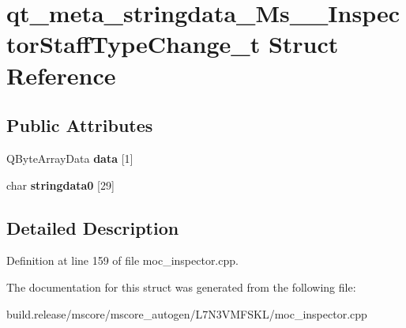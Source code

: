 \hypertarget{structqt__meta__stringdata___ms_____inspector_staff_type_change__t}{}\section{qt\+\_\+meta\+\_\+stringdata\+\_\+\+Ms\+\_\+\+\_\+\+Inspector\+Staff\+Type\+Change\+\_\+t Struct Reference}
\label{structqt__meta__stringdata___ms_____inspector_staff_type_change__t}
\subsection*{Public Attributes}
\begin{DoxyCompactItemize}
\item 
\mbox{\label{structqt__meta__stringdata___ms_____inspector_staff_type_change__t_a28ab1f6df434dcad7b65ca5a0aef530a}} 
Q\+Byte\+Array\+Data {\bfseries data} \mbox{[}1\mbox{]}
\item 
\mbox{\label{structqt__meta__stringdata___ms_____inspector_staff_type_change__t_a2ed5536fad0521e83771d45ee45fa00a}} 
char {\bfseries stringdata0} \mbox{[}29\mbox{]}
\end{DoxyCompactItemize}


\subsection{Detailed Description}


Definition at line 159 of file moc\+\_\+inspector.\+cpp.



The documentation for this struct was generated from the following file\+:\begin{DoxyCompactItemize}
\item 
build.\+release/mscore/mscore\+\_\+autogen/\+L7\+N3\+V\+M\+F\+S\+K\+L/moc\+\_\+inspector.\+cpp\end{DoxyCompactItemize}
